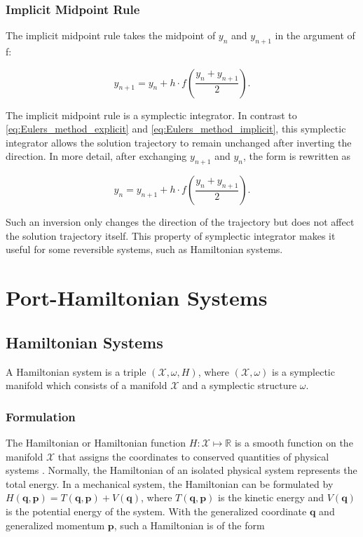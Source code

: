 \documentclass[
	parskip, 			   %
	twoside, 			   %
	DIV=14, 			   %
	BCOR=15.0mm, 		   %
	headsepline, 		   %
	open=right, 		   %
	captions=tableheading, %
	bibliography=totoc,    %
	numbers=noenddot       %
]{scrreprt}
\begin{document}
\subsection{Implicit Midpoint Rule}
The implicit midpoint rule takes the midpoint of $y_{n}$ and $y_{n+1}$ in the argument of f:

\begin{equation}
    \label{eq:Midpoint_rule_implicit}
    y_{n+1} = y_{n} + h \cdot f(\frac{y_{n} + y_{n+1}}{2}).
\end{equation}

The implicit midpoint rule is a symplectic integrator. In contrast to \ref{eq:Eulers_method_explicit} and \ref{eq:Eulers_method_implicit}, this symplectic integrator allows the solution trajectory to remain unchanged after inverting the direction. In more detail, after exchanging $y_{n+1}$ and $y_{n}$, the form is rewritten as

\begin{equation}
    \label{eq:Midpoint_rule_implicit_inverted}
    y_{n} = y_{n+1} + h \cdot f(\frac{y_{n} + y_{n+1}}{2}).
\end{equation}

Such an inversion only changes the direction of the trajectory but does not affect the solution trajectory itself. This property of symplectic integrator makes it useful for some reversible systems, such as Hamiltonian systems.

\clearpage
\chapter{Port-Hamiltonian Systems}
\label{ch:chapter3}

\section{Hamiltonian Systems}
A Hamiltonian system is a triple $(\mathcal{X},\omega,H)$, where $(\mathcal{X},\omega)$ is a symplectic manifold which consists of a manifold $\mathcal{X}$ and a symplectic structure $\omega$.

\subsection{Formulation}
The Hamiltonian or Hamiltonian function $H: \mathcal{X} \mapsto \mathbb{R} $ is a smooth function on the manifold $\mathcal{X}$ that assigns the coordinates to conserved quantities of physical systems \cite{rudolph2017differential}. Normally, the Hamiltonian of an isolated physical system represents the total energy. In a mechanical system, the Hamiltonian can be formulated by $H(\mathbf{q},\mathbf{p})=T(\mathbf{q},\mathbf{p})+V(\mathbf{q})$, where $T(\mathbf{q},\mathbf{p})$ is the kinetic energy and $V(\mathbf{q})$ is the potential energy of the system. With the generalized coordinate $\mathbf{q}$ and generalized momentum $\mathbf{p}$, such a Hamiltonian is of the form
\end{document}
